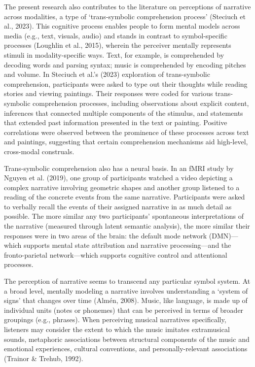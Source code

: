 \documentclass[12pt,twoside]{reedthesis}
\begin{document}
The present research also contributes to the literature on perceptions of narrative across modalities, a type of ‘trans-symbolic comprehension process’ (Steciuch et al., 2023). This cognitive process enables people to form mental models across media (e.g., text, visuals, audio) and stands in contrast to symbol-specific processes (Loughlin et al., 2015), wherein the perceiver mentally represents stimuli in modality-specific ways. Text, for example, is comprehended by decoding words and parsing syntax; music is comprehended by encoding pitches and volume. In Steciuch et al.’s (2023) exploration of trans-symbolic comprehension, participants were asked to type out their thoughts while reading stories and viewing paintings. Their responses were coded for various trans-symbolic comprehension processes, including observations about explicit content, inferences that connected multiple components of the stimulus, and statements that extended past information presented in the text or painting. Positive correlations were observed between the prominence of these processes across text and paintings, suggesting that certain comprehension mechanisms aid high-level, cross-modal construals.

Trans-symbolic comprehension also has a neural basis. In an fMRI study by Nguyen et al. (2019), one group of participants watched a video depicting a complex narrative involving geometric shapes and another group listened to a reading of the concrete events from the same narrative. Participants were asked to verbally recall the events of their assigned narrative in as much detail as possible. The more similar any two participants’ spontaneous interpretations of the narrative (measured through latent semantic analysis), the more similar their responses were in two areas of the brain: the default mode network (DMN)—which supports mental state attribution and narrative processing—and the fronto-parietal network—which supports cognitive control and attentional processes.

The perception of narrative seems to transcend any particular symbol system. At a broad level, mentally modeling a narrative involves understanding a ‘system of signs’ that changes over time (Almén, 2008). Music, like language, is made up of individual units (notes or phonemes) that can be perceived in terms of broader groupings (e.g., phrases). When perceiving musical narratives specifically, listeners may consider the extent to which the music imitates extramusical sounds, metaphoric associations between structural components of the music and emotional experiences, cultural conventions, and personally-relevant associations (Trainor \& Trehub, 1992). 
\end{document}
